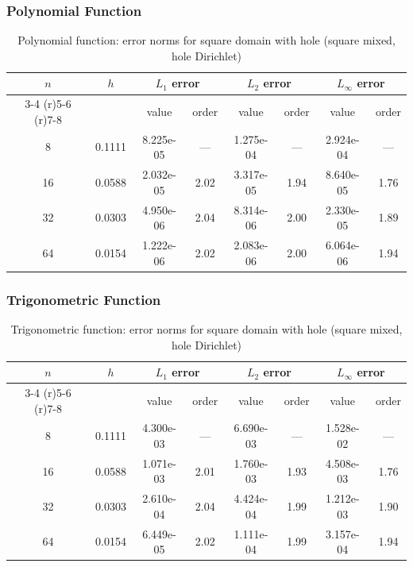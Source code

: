 \documentclass[12pt,a4paper]{article}
\begin{document}
\subsubsection{Polynomial Function}
\begin{table}[H]
\centering
\caption{Polynomial function: error norms for square domain with hole (square mixed, hole Dirichlet)}
\begin{tabular}{cccccccc}
\toprule
$n$ & $h$ & \multicolumn{2}{c}{$L_1$ error} & \multicolumn{2}{c}{$L_2$ error} & \multicolumn{2}{c}{$L_\infty$ error} \\
\cmidrule(r){3-4} \cmidrule(r){5-6} \cmidrule(r){7-8}
& & value & order & value & order & value & order \\
\midrule
8  & 0.1111 & 8.225e-05 & --- & 1.275e-04 & --- & 2.924e-04 & --- \\
16 & 0.0588 & 2.032e-05 & 2.02 & 3.317e-05 & 1.94 & 8.640e-05 & 1.76 \\
32 & 0.0303 & 4.950e-06 & 2.04 & 8.314e-06 & 2.00 & 2.330e-05 & 1.89 \\
64 & 0.0154 & 1.222e-06 & 2.02 & 2.083e-06 & 2.00 & 6.064e-06 & 1.94 \\
\bottomrule
\end{tabular}
\end{table}

\subsubsection{Trigonometric Function}
\begin{table}[H]
\centering
\caption{Trigonometric function: error norms for square domain with hole (square mixed, hole Dirichlet)}
\begin{tabular}{cccccccc}
\toprule
$n$ & $h$ & \multicolumn{2}{c}{$L_1$ error} & \multicolumn{2}{c}{$L_2$ error} & \multicolumn{2}{c}{$L_\infty$ error} \\
\cmidrule(r){3-4} \cmidrule(r){5-6} \cmidrule(r){7-8}
& & value & order & value & order & value & order \\
\midrule
8  & 0.1111 & 4.300e-03 & --- & 6.690e-03 & --- & 1.528e-02 & --- \\
16 & 0.0588 & 1.071e-03 & 2.01 & 1.760e-03 & 1.93 & 4.508e-03 & 1.76 \\
32 & 0.0303 & 2.610e-04 & 2.04 & 4.424e-04 & 1.99 & 1.212e-03 & 1.90 \\
64 & 0.0154 & 6.449e-05 & 2.02 & 1.111e-04 & 1.99 & 3.157e-04 & 1.94 \\
\bottomrule
\end{tabular}
\end{table}
\end{document}
